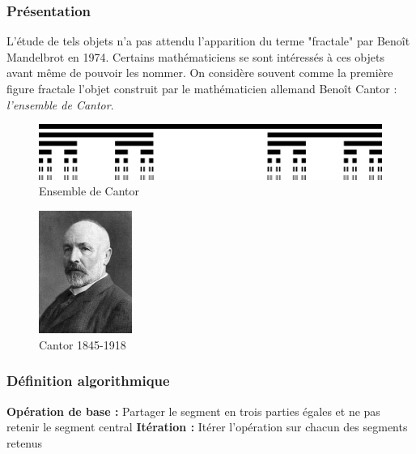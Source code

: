 \documentclass[a4paper,10pt]{report}
\begin{document}
\subsubsection{Présentation}
\begin{minipage}[c]{.70\linewidth}
	\indent L'étude de tels objets n'a pas attendu l'apparition du terme "fractale" par Benoît Mandelbrot en 1974. Certains mathématiciens se sont intéressés à 	ces objets avant même de pouvoir les nommer. On considère souvent comme la première figure fractale l'objet construit par le mathématicien allemand Benoît Cantor : \textit{l'ensemble de Cantor}.
	\begin{figure}[H]
	\caption{Ensemble de Cantor}
	\includegraphics[width=\textwidth]{cantor.png}
	\end{figure}
\end{minipage} \hfill
\begin{minipage}[c]{.05\linewidth}
\end{minipage} \hfill
\begin{minipage}[c]{.21\linewidth}
	\begin{figure}[H]
	\includegraphics[height=4cm]{mr_cantor.jpg}
	\caption{Cantor 1845-1918}
	\end{figure}
\end{minipage}

\subsubsection{Définition algorithmique}
\begin{algorithm}
\begin{algorithmic}
\STATE \textbf{Opération de base :} Partager le segment en trois parties égales et ne pas retenir le segment central
\STATE \textbf{Itération :} Itérer l'opération sur chacun des segments retenus
\end{algorithmic}
\end{algorithm}
\end{document}

